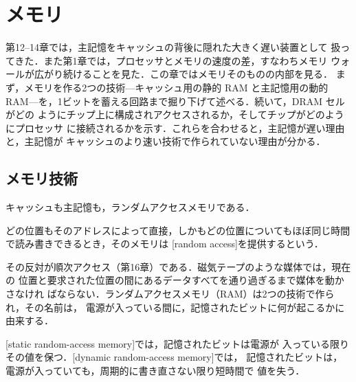 \documentclass[../main.tex]{subfiles}
\begin{document}
\chapter{メモリ}

第12--14章では，主記憶をキャッシュの背後に隠れた大きく遅い装置として
扱ってきた．また第1章では，プロセッサとメモリの速度の差，すなわちメモリ
ウォールが広がり続けることを見た．この章ではメモリそのものの内部を見る．
まず，メモリを作る2つの技術---キャッシュ用の静的 RAM と主記憶用の動的
RAM---を，1ビットを蓄える回路まで掘り下げて述べる．続いて，DRAM セルがどの
ようにチップ上に構成されアクセスされるか，そしてチップがどのようにプロセッサ
に接続されるかを示す．これらを合わせると，主記憶が遅い理由と，主記憶が
キャッシュのより速い技術で作られていない理由が分かる．

\section{メモリ技術}
\label{sec:l15-technologies}

キャッシュも主記憶も，ランダムアクセスメモリである．

\begin{definition}[ランダムアクセス]
  どの位置もそのアドレスによって直接，しかもどの位置についてもほぼ同じ時間
  で読み書きできるとき，そのメモリは
  [random access]を提供するという．
\end{definition}

その反対が順次アクセス（第16章）である．磁気テープのような媒体では，現在の
位置と要求された位置の間にあるデータすべてを通り過ぎるまで媒体を動かさなけれ
ばならない．ランダムアクセスメモリ（RAM）は2つの技術で作られ，その名前は，
電源が入っている間に，記憶されたビットに何が起こるかに由来する．

\begin{definition}
  [static random-access memory]では，記憶されたビットは電源が
  入っている限りその値を保つ．[dynamic random-access memory]では，
  記憶されたビットは，電源が入っていても，周期的に書き直さない限り短時間で
  値を失う．
\end{definition}
\end{document}
